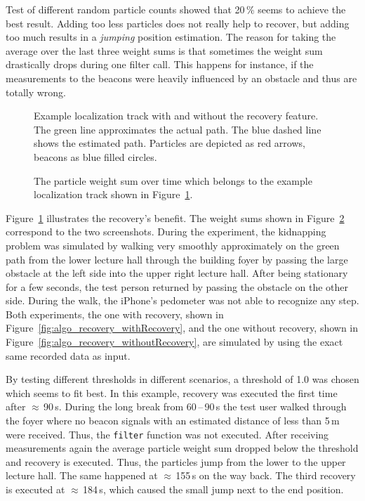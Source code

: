 Test of different random particle counts showed that 20\,\% seems to achieve the best result. Adding too less particles does not really help to recover, but adding too much results in a \emph{jumping} position estimation. The reason for taking the average over the last three weight sums is that sometimes the weight sum drastically drops during one filter call. This happens for instance, if the measurements to the beacons were heavily influenced by an obstacle and thus are totally wrong.

\begin{figure}
	
	\caption {Example localization track with and without the recovery feature. The green line approximates the actual path. The blue dashed line shows the estimated path. Particles are depicted as red arrows, beacons as blue filled circles.}
	\label{fig:algo_recoveryImg}
\end{figure}

\begin{figure}
	
	\caption {The particle weight sum over time which belongs to the example localization track shown in Figure~\ref{fig:algo_recoveryImg}.}
	\label{fig:algo_recovery}
\end{figure}

Figure~\ref{fig:algo_recoveryImg} illustrates the recovery's benefit. The weight sums shown in Figure~\ref{fig:algo_recovery} correspond to the two screenshots. During the experiment, the kidnapping problem was simulated by walking very smoothly approximately on the green path from the lower lecture hall through the building foyer by passing the large obstacle at the left side into the upper right lecture hall. After being stationary for a few seconds, the test person returned by passing the obstacle on the other side. During the walk, the iPhone's pedometer was not able to recognize any step. Both experiments, the one with recovery, shown in Figure~\ref{fig:algo_recovery_withRecovery}, and the one without recovery, shown in Figure~\ref{fig:algo_recovery_withoutRecovery}, are simulated by using the exact same recorded data as input.

By testing different thresholds in different scenarios, a threshold of 1.0 was chosen which seems to fit best. In this example, recovery was executed the first time after $\approx$\,90\,s. During the long break from 60\,--\,90\,s the test user walked through the foyer where no beacon signals with an estimated distance of less than 5\,m were received. Thus, the \texttt{filter} function was not executed. After receiving measurements again the average particle weight sum dropped below the threshold and recovery is executed. Thus, the particles jump from the lower to the upper lecture hall. The same happened at $\approx$\,155\,s on the way back. The third recovery is executed at $\approx$\,184\,s, which caused the small jump next to the end position.

